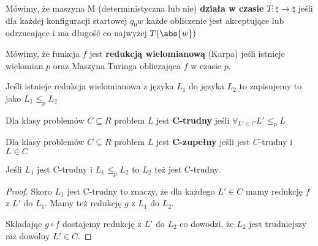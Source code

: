 \begin{definition}
    Mówimy, że maszyna M (deterministyczna lub nie) \textbf{działa w czasie} \( T : \natural \rightarrow \natural \) jeśli dla każdej konfiguracji startowej \( q_0 w \) każde obliczenie jest akceptujące lub odrzucające i ma długość co najwyżej \( T(\abs{w}) \)
\end{definition}

\begin{definition}
    Mówimy, że funkcja \( f \) jest \textbf{redukcją wielomianową} (Karpa) jeśli istnieje wielomian \( p \) oraz Maszyna Turinga obliczająca \( f \) w czasie \( p \). 
    
    Jeśli istnieje redukcja wielomianowa z języka \( L_1 \) do języka \( L_2 \) to zapisujemy to jako \( L_1 \leq_p L_2 \)
\end{definition}

\begin{definition}
    Dla klasy problemów \( C \subseteq R \) problem \( L \) jest \textbf{C-trudny} jeśli \( \forall_{L' \in C} L' \leq_p L \)
\end{definition}
\begin{definition}
    Dla klasy problemów \( C \subseteq R \) problem \( L \) jest \textbf{C-zupełny} jeśli jest \(C\)-trudny i \( L \in C \)
\end{definition}

\begin{lemma}
    Jeśli \( L_1 \) jest C-trudny i \( L_1 \leq_p L_2 \) to \( L_2 \) też jest C-trudny. 
\end{lemma}

\begin{proof}
    Skoro \( L_1 \) jest C-trudny to znaczy, że dla każdego \( L' \in C \) mamy redukcję \( f \) z \( L' \) do \( L_1 \).
    Mamy też redukcję \( g \) z \( L_1 \) do \( L_2 \).
    
    Składając \( g \circ f \) dostajemy redukcję z \( L' \)  do \( L_2 \) co dowodzi, że \( L_2 \) jest trudniejszy niż dowolny \( L' \in C \).
\end{proof}
